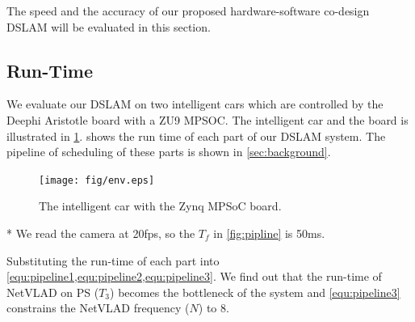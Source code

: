 \label{sec:experiment}
The speed and the accuracy of our proposed hardware-software co-design DSLAM will be evaluated in this section.

\subsection{Run-Time}

We evaluate our DSLAM on two intelligent cars which are controlled by the Deephi Aristotle board with a ZU9 MPSOC. The intelligent car and the board is illustrated in \cref{fig:env}.  shows the run time of each part of our DSLAM system. The pipeline of scheduling of these parts is shown in \cref{sec:background}.


\begin{figure}[t]
    \centering  
    \texttt{[image: fig/env.eps]}
    \caption{The intelligent car with the Zynq MPSoC board.}
    \label{fig:env}
\end{figure}

\begin{table}[h]
    \centering
    \caption{Run-Time of each part in our DSLAM}
    \footnotesize
    \begin{threeparttable}
  \begin{tablenotes}
        \item[*] We read the camera at 20fps, so the $T_{f}$ in \cref{fig:pipline} is 50ms.
        \end{tablenotes}
      \end{threeparttable}
    \label{tab:time}%
    
  \end{table}%

Substituting the run-time of each part into \cref{equ:pipeline1,equ:pipeline2,equ:pipeline3}. We find out that the run-time of NetVLAD on PS ($T_{3}$) becomes the bottleneck of the system and \cref{equ:pipeline3} constrains the NetVLAD frequency ($N$) to $8$.

